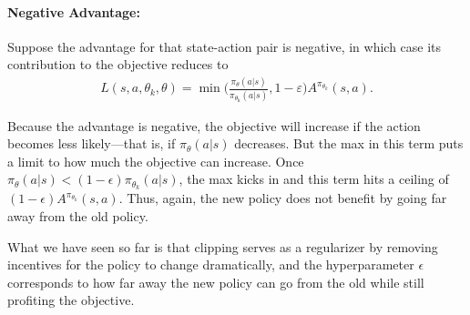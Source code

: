 \paragraph{Negative Advantage:} Suppose the advantage for that state-action pair is negative, in which case its contribution to the objective reduces to
\begin{align}
	L(s, a, \theta_k, \theta) = \min \Bigg(\frac{\pi_{\theta}\left(a | s\right)}{\pi_{\theta_{\text {k}}}\left(a | s\right)}, 1-\varepsilon \Bigg) A^{\pi_{\theta_k}}(s,a).
	\label{eq:ppo_negative}
\end{align}

Because the advantage is negative, the objective will increase if the action becomes less likely—that is, if $\pi_{\theta}(a|s)$ decreases. But the max in this term puts a limit to how much the objective can increase. Once $\pi_{\theta}(a|s) < (1-\epsilon) \pi_{\theta_k}(a|s)$, the max kicks in and this term hits a ceiling of $(1-\epsilon) A^{\pi_{\theta_k}}(s,a)$. Thus, again, the new policy does not benefit by going far away from the old policy.

What we have seen so far is that clipping serves as a regularizer by removing incentives for the policy to change dramatically, and the hyperparameter $\epsilon$ corresponds to how far away the new policy can go from the old while still profiting the objective.

